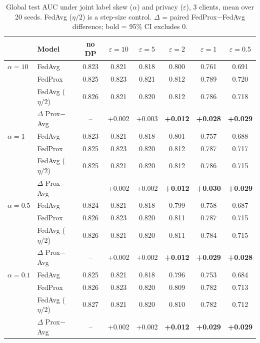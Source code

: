 \begin{table}[t]
\caption{Global test AUC under joint label skew ($\alpha$) and privacy ($\varepsilon$), 3 clients, mean over 20 seeds. FedAvg ($\eta/2$) is a step-size control. $\Delta$ = paired FedProx$-$FedAvg difference; bold = 95\% CI excludes 0.}
\centering\small
\begin{tabular}{llcccccc}
\toprule
 & Model & no DP & $\varepsilon=10$ & $\varepsilon=5$ & $\varepsilon=2$ & $\varepsilon=1$ & $\varepsilon=0.5$ \\
\midrule
$\alpha=10$ & FedAvg & 0.823 & 0.821 & 0.818 & 0.800 & 0.761 & 0.691 \\
 & FedProx & 0.825 & 0.823 & 0.821 & 0.812 & 0.789 & 0.720 \\
 & FedAvg ($\eta/2$) & 0.826 & 0.821 & 0.820 & 0.812 & 0.786 & 0.718 \\
 & $\Delta$ Prox$-$Avg & -- & +0.002 & +0.003 & \textbf{+0.012} & \textbf{+0.028} & \textbf{+0.029} \\
\midrule
$\alpha=1$ & FedAvg & 0.823 & 0.821 & 0.818 & 0.801 & 0.757 & 0.688 \\
 & FedProx & 0.825 & 0.823 & 0.820 & 0.812 & 0.787 & 0.717 \\
 & FedAvg ($\eta/2$) & 0.825 & 0.821 & 0.820 & 0.812 & 0.786 & 0.715 \\
 & $\Delta$ Prox$-$Avg & -- & +0.002 & +0.002 & \textbf{+0.012} & \textbf{+0.030} & \textbf{+0.029} \\
\midrule
$\alpha=0.5$ & FedAvg & 0.824 & 0.821 & 0.818 & 0.799 & 0.758 & 0.687 \\
 & FedProx & 0.826 & 0.823 & 0.820 & 0.811 & 0.787 & 0.715 \\
 & FedAvg ($\eta/2$) & 0.826 & 0.821 & 0.820 & 0.811 & 0.784 & 0.715 \\
 & $\Delta$ Prox$-$Avg & -- & +0.002 & +0.002 & \textbf{+0.012} & \textbf{+0.029} & \textbf{+0.028} \\
\midrule
$\alpha=0.1$ & FedAvg & 0.825 & 0.821 & 0.818 & 0.796 & 0.753 & 0.684 \\
 & FedProx & 0.826 & 0.823 & 0.820 & 0.809 & 0.782 & 0.713 \\
 & FedAvg ($\eta/2$) & 0.827 & 0.821 & 0.820 & 0.810 & 0.782 & 0.712 \\
 & $\Delta$ Prox$-$Avg & -- & +0.002 & +0.002 & \textbf{+0.012} & \textbf{+0.029} & \textbf{+0.029} \\
\bottomrule
\end{tabular}
\label{tab:interaction}
\end{table}
